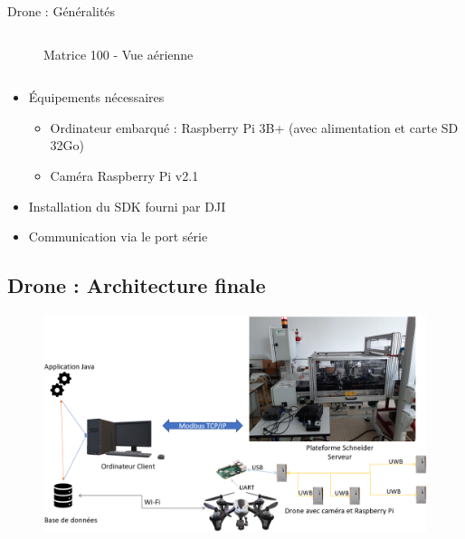 \begin{frame}[allowframebreaks]{Drone : Généralités}
\begin{columns}[T]
\begin{column}{0.5\textwidth}
\begin{figure}
                        \caption*{Matrice 100 - Vue aérienne}
                    \end{figure}
                \end{column}
            \end{columns}
        \end{frame}
%
        \begin{frame}[allowframebreaks]
                \begin{block}{}
                    \begin{itemize}
                        [square]
                        \item Équipements nécessaires
                            \begin{itemize}
                                \item Ordinateur embarqué : Raspberry Pi 3B+ (avec alimentation et carte SD 32Go)
                                \item Caméra Raspberry Pi v2.1
                            \end{itemize}
                        \item Installation du SDK fourni par DJI
                        \item Communication via le port série
                    \end{itemize}
                \end{block}
            \end{frame}
%
    \subsection{Drone : Architecture finale}
        \begin{frame}[allowframebreaks]
            \begin{figure}[H]
    			\centering
    			\includegraphics[width=0.9\linewidth]{images/architectureGeneraleTotale.png}
    			\label{fig:archiGen}
    		\end{figure}
        \end{frame}
%
